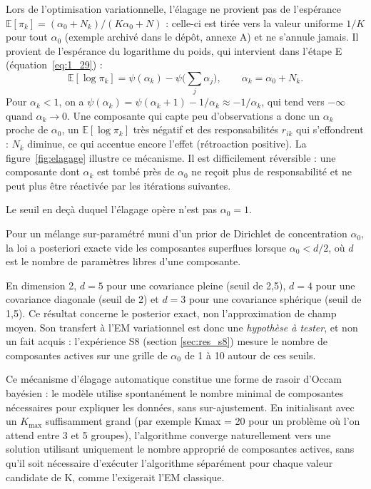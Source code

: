 Lors de l'optimisation variationnelle, l'élagage ne provient pas de l'espérance $\mathbb{E}[\pi_k] = (\alpha_0 + N_k)/(K\alpha_0 + N)$ : celle-ci est tirée vers la valeur uniforme $1/K$ pour tout $\alpha_0$ (exemple archivé dans le dépôt, annexe A) et ne s'annule jamais. Il provient de l'espérance du logarithme du poids, qui intervient dans l'étape E (équation~\ref{eq:1_29}) :
\begin{equation*}
\mathbb{E}[\log \pi_k] = \psi(\alpha_k) - \psi\Big(\sum_{j}\alpha_j\Big), \qquad \alpha_k = \alpha_0 + N_k .
\end{equation*}
Pour $\alpha_k < 1$, on a $\psi(\alpha_k) = \psi(\alpha_k + 1) - 1/\alpha_k \approx -1/\alpha_k$, qui tend vers $-\infty$ quand $\alpha_k \to 0$. Une composante qui capte peu d'observations a donc un $\alpha_k$ proche de $\alpha_0$, un $\mathbb{E}[\log \pi_k]$ très négatif et des responsabilités $r_{ik}$ qui s'effondrent : $N_k$ diminue, ce qui accentue encore l'effet (rétroaction positive). La figure~\ref{fig:elagage} illustre ce mécanisme. Il est difficilement réversible : une composante dont $\alpha_k$ est tombé près de $\alpha_0$ ne reçoit plus de responsabilité et ne peut plus être réactivée par les itérations suivantes.



Le seuil en deçà duquel l'élagage opère n'est pas $\alpha_0 = 1$.

\begin{theoreme}\label{thm:rousseau}
Pour un mélange sur-paramétré muni d'un prior de Dirichlet de concentration $\alpha_0$, la loi a posteriori exacte vide les composantes superflues lorsque $\alpha_0 < d/2$, où $d$ est le nombre de paramètres libres d'une composante.
\end{theoreme}

En dimension 2, $d = 5$ pour une covariance pleine (seuil de 2,5), $d = 4$ pour une covariance diagonale (seuil de 2) et $d = 3$ pour une covariance sphérique (seuil de 1,5). Ce résultat concerne le posterior exact, non l'approximation de champ moyen. Son transfert à l'EM variationnel est donc une \emph{hypothèse à tester}, et non un fait acquis : l'expérience S8 (section \ref{sec:res_s8}) mesure le nombre de composantes actives sur une grille de $\alpha_0$ de 1 à 10 autour de ces seuils.

Ce mécanisme d'élagage automatique constitue une forme de rasoir d'Occam bayésien : le modèle utilise spontanément le nombre minimal de composantes nécessaires pour expliquer les données, sans sur-ajustement. En initialisant avec un $K_{\max}$ suffisamment grand (par exemple Kmax = 20 pour un problème où l'on attend entre 3 et 5 groupes), l'algorithme converge naturellement vers une solution utilisant uniquement le nombre approprié de composantes actives, sans qu'il soit nécessaire d'exécuter l'algorithme séparément pour chaque valeur candidate de K, comme l'exigerait l'EM classique.

